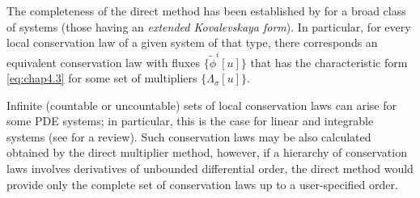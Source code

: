 \documentclass[alpha-refs, 12pt]{wiley-article}
\begin{document}
The completeness of the direct method has been established by \cite{martinez1979noether} for a broad class of systems (those having an \emph{extended Kovalevskaya form}). In particular, for every local conservation law of a given system of that type, there corresponds an equivalent conservation law with fluxes $\{\tilde{\phi}^{i}[u]\}$ that has the characteristic form \eqref{eq:chap4.3} for some set of multipliers $\{\Lambda_{\sigma}[u]\}$.

Infinite (countable or uncountable) sets of local conservation laws can arise for some PDE systems; in particular, this is the case for linear and integrable systems (see \citet{cheviakov2024analytical} for a review). Such conservation laws may be also calculated obtained by the direct multiplier method, however, if a hierarchy of conservation laws involves derivatives of unbounded differential order, the direct method would provide only the complete set of conservation laws up to a user-specified order.

\end{document}
